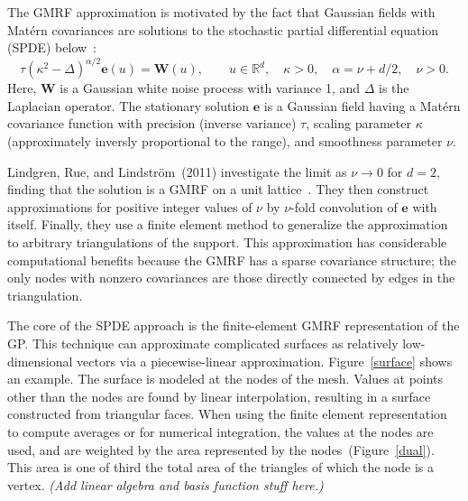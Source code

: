 \documentclass[]{interact}
\begin{document}
The GMRF approximation is motivated by the fact that Gaussian fields with
Mat\'{e}rn covariances are solutions to the stochastic partial differential
equation (SPDE) below~\cite{lindgrenetal}:
\begin{displaymath}
\tau(\kappa^{2} - \Delta)^{\alpha / 2} \mathbf{e}(u) = \mathbf{W}(u),
\qquad u \in \mathbb{R}^d, \quad \kappa > 0,
\quad \alpha = \nu + d/2, \quad \nu > 0.
\end{displaymath}
Here, \(\mathbf{W}\) is a Gaussian white noise process with variance 1, and
\(\Delta\) is the Laplacian operator. The stationary solution
\(\mathbf{e}\) is a Gaussian field having a Mat\'{e}rn covariance
function with precision (inverse variance) \(\tau\),  scaling parameter
\(\kappa\) (approximately inversly proportional to the range), and smoothness
parameter \(\nu\).

Lindgren, Rue, and Lindstr\"{o}m~(2011) investigate the limit as \(\nu \to 0\) for
\(d = 2\), finding that the solution is a GMRF on a unit
lattice~\cite{lindgrenetal}. They then construct approximations for positive
integer values of \(\nu\) by \(\nu\)-fold convolution of \(\mathbf{e}\)
with itself. Finally, they use a finite element method to generalize the
approximation to arbitrary triangulations of the support. This approximation
has considerable computational benefits because the GMRF has a sparse
covariance structure; the only nodes with nonzero covariances are those
directly connected by edges in the triangulation.

The core of the SPDE approach is the finite-element GMRF representation of the
GP. This technique can approximate complicated surfaces as relatively
low-dimensional vectors via a piecewise-linear approximation.
Figure~\ref{surface} shows an example. The surface is modeled at the nodes of
the mesh. Values at points other than the nodes are found by linear
interpolation, resulting in a surface constructed from triangular faces. When
using the finite element representation to compute averages or for numerical
integration, the values at the nodes are used, and are weighted by the area
represented by the nodes~(Figure~\ref{dual}). This area is one of third the
total area of the triangles of which the node is a vertex.
{\it (Add linear algebra and basis function stuff here.)}
\end{document}
